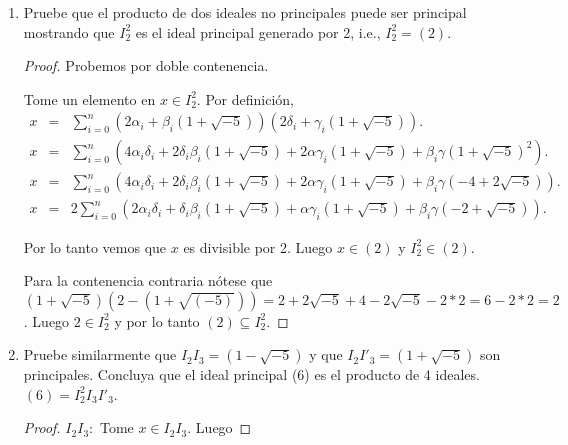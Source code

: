 \documentclass[letter,twoside,12pt]{article}
\begin{document}
\begin{enumerate}[label=\textbf{(\alph*)}]
\begin{proof}
\begin{itemize}
\item $ I_3' $: Similar al caso anterior.

$ 9 = N(\alpha)N(a+b\sqrt{-1}) $. Si $ N(a+b\sqrt{-1})  = 9$ entonces $ N(\alpha)=1 $ lo que implica que $ \alpha=\pm1 $ y por lo tanto $ a+b\sqrt{-1} = \pm3 $. Sin embargo, este no puede ser el caso porque $ 2-\sqrt{-5} $ no es divisible por 3. $ N(a+b\sqrt{-5}  $  no puede ser 3 porque ningun elemento en el anillo tiene norma 3. Por ultimo  si $ N(a+b\sqrt{-5}=1 $ entonces $ a+b\sqrt{-5}= \pm1 $. Entonces, de nuevo tenemos que $ 1 = 3\gamma+(2-\sqrt{-5})\delta $, multiplicando por $ 2+\sqrt{-5} $ tendriamos que $ 2+\sqrt{-5} = 3(2+\sqrt{-5})\gamma+9\delta $ y concluiriamos que $ 2+\sqrt{-5} $ sería divisible por 3 lo cual es falso.
\end{itemize}
\end{proof}

\item Pruebe que el producto de dos ideales no principales puede ser principal mostrando que $ I_2^2$ es el ideal principal generado por 2,  i.e., $ I_2^2=(2) $.
\begin{proof}
Probemos por doble contenencia.

Tome un elemento en  $x \in I_2^2 $. Por definición, 
\begin{eqnarray}
x &=& \sum_{i=0}^n (2\alpha_i+ \beta_i(1+\sqrt{-5}))(2\delta_i+ \gamma_i(1+\sqrt{-5})). \nonumber
\\x &=& \sum_{i=0}^n (4\alpha_i\delta_i+ 2\delta_i\beta_i(1+\sqrt{-5})+2\alpha\gamma_i(1+\sqrt{-5})+\beta_i\gamma(1+\sqrt{-5})^2). \nonumber
\\x &=& \sum_{i=0}^n (4\alpha_i\delta_i+ 2\delta_i\beta_i(1+\sqrt{-5})+2\alpha\gamma_i(1+\sqrt{-5})+\beta_i\gamma(-4+2\sqrt{-5})). \nonumber
\\x &=& 2\sum_{i=0}^n (2\alpha_i\delta_i+ \delta_i\beta_i(1+\sqrt{-5})+\alpha\gamma_i(1+\sqrt{-5})+\beta_i\gamma(-2+\sqrt{-5})). \nonumber
\end{eqnarray}

Por lo tanto vemos que $ x $ es divisible por 2. Luego $ x \in (2) $
 y $ I_2^2 \in (2) $.

Para la contenencia contraria nótese que $ (1+\sqrt{-5})(2-(1+\sqrt{(-5)}))=2+2\sqrt{-5}+4-2\sqrt{-5}-2*2=6-2*2=2$. Luego $ 2 \in I_2^2 $ y por lo tanto $ (2) \subseteq I_2^2 $.
\end{proof}

\item Pruebe similarmente que $ I_2I_3 = (1 - \sqrt{-5}) $ y que $ I_2I'_3=(1+\sqrt{-5}) $ son principales. Concluya que el ideal principal (6) es el producto de 4 ideales. $ (6)=I_2^2I_3I'_3 $.
\begin{proof}
$ I_2I_3: $ Tome $ x \in I_2I_3 $. Luego


\end{proof}
\end{enumerate}
\end{document}
